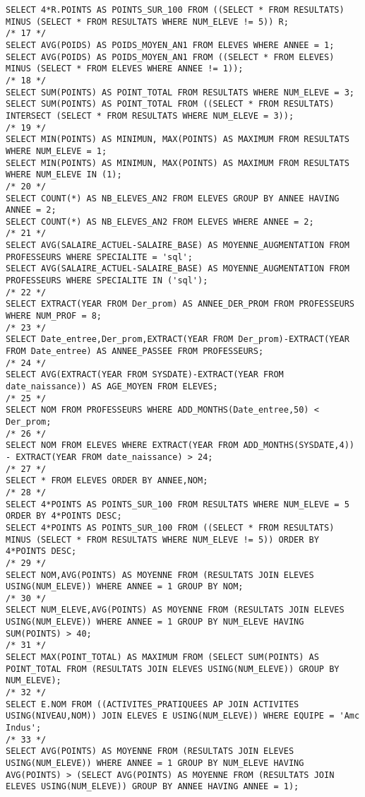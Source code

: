 \documentclass{report}
\begin{document}
\begin{lstlisting}
SELECT 4*R.POINTS AS POINTS_SUR_100 FROM ((SELECT * FROM RESULTATS) MINUS (SELECT * FROM RESULTATS WHERE NUM_ELEVE != 5)) R;
/* 17 */
SELECT AVG(POIDS) AS POIDS_MOYEN_AN1 FROM ELEVES WHERE ANNEE = 1;
SELECT AVG(POIDS) AS POIDS_MOYEN_AN1 FROM ((SELECT * FROM ELEVES) MINUS (SELECT * FROM ELEVES WHERE ANNEE != 1));
/* 18 */
SELECT SUM(POINTS) AS POINT_TOTAL FROM RESULTATS WHERE NUM_ELEVE = 3;
SELECT SUM(POINTS) AS POINT_TOTAL FROM ((SELECT * FROM RESULTATS) INTERSECT (SELECT * FROM RESULTATS WHERE NUM_ELEVE = 3));
/* 19 */
SELECT MIN(POINTS) AS MINIMUN, MAX(POINTS) AS MAXIMUM FROM RESULTATS WHERE NUM_ELEVE = 1;
SELECT MIN(POINTS) AS MINIMUN, MAX(POINTS) AS MAXIMUM FROM RESULTATS WHERE NUM_ELEVE IN (1);
/* 20 */
SELECT COUNT(*) AS NB_ELEVES_AN2 FROM ELEVES GROUP BY ANNEE HAVING ANNEE = 2;
SELECT COUNT(*) AS NB_ELEVES_AN2 FROM ELEVES WHERE ANNEE = 2;
/* 21 */
SELECT AVG(SALAIRE_ACTUEL-SALAIRE_BASE) AS MOYENNE_AUGMENTATION FROM PROFESSEURS WHERE SPECIALITE = 'sql';
SELECT AVG(SALAIRE_ACTUEL-SALAIRE_BASE) AS MOYENNE_AUGMENTATION FROM PROFESSEURS WHERE SPECIALITE IN ('sql');
/* 22 */
SELECT EXTRACT(YEAR FROM Der_prom) AS ANNEE_DER_PROM FROM PROFESSEURS WHERE NUM_PROF = 8;
/* 23 */
SELECT Date_entree,Der_prom,EXTRACT(YEAR FROM Der_prom)-EXTRACT(YEAR FROM Date_entree) AS ANNEE_PASSEE FROM PROFESSEURS;
/* 24 */
SELECT AVG(EXTRACT(YEAR FROM SYSDATE)-EXTRACT(YEAR FROM date_naissance)) AS AGE_MOYEN FROM ELEVES;
/* 25 */
SELECT NOM FROM PROFESSEURS WHERE ADD_MONTHS(Date_entree,50) < Der_prom;
/* 26 */
SELECT NOM FROM ELEVES WHERE EXTRACT(YEAR FROM ADD_MONTHS(SYSDATE,4)) - EXTRACT(YEAR FROM date_naissance) > 24;
/* 27 */
SELECT * FROM ELEVES ORDER BY ANNEE,NOM;
/* 28 */
SELECT 4*POINTS AS POINTS_SUR_100 FROM RESULTATS WHERE NUM_ELEVE = 5 ORDER BY 4*POINTS DESC;
SELECT 4*POINTS AS POINTS_SUR_100 FROM ((SELECT * FROM RESULTATS) MINUS (SELECT * FROM RESULTATS WHERE NUM_ELEVE != 5)) ORDER BY 4*POINTS DESC;
/* 29 */
SELECT NOM,AVG(POINTS) AS MOYENNE FROM (RESULTATS JOIN ELEVES USING(NUM_ELEVE)) WHERE ANNEE = 1 GROUP BY NOM;
/* 30 */
SELECT NUM_ELEVE,AVG(POINTS) AS MOYENNE FROM (RESULTATS JOIN ELEVES USING(NUM_ELEVE)) WHERE ANNEE = 1 GROUP BY NUM_ELEVE HAVING SUM(POINTS) > 40;
/* 31 */
SELECT MAX(POINT_TOTAL) AS MAXIMUM FROM (SELECT SUM(POINTS) AS POINT_TOTAL FROM (RESULTATS JOIN ELEVES USING(NUM_ELEVE)) GROUP BY NUM_ELEVE);
/* 32 */
SELECT E.NOM FROM ((ACTIVITES_PRATIQUEES AP JOIN ACTIVITES USING(NIVEAU,NOM)) JOIN ELEVES E USING(NUM_ELEVE)) WHERE EQUIPE = 'Amc Indus';
/* 33 */
SELECT AVG(POINTS) AS MOYENNE FROM (RESULTATS JOIN ELEVES USING(NUM_ELEVE)) WHERE ANNEE = 1 GROUP BY NUM_ELEVE HAVING AVG(POINTS) > (SELECT AVG(POINTS) AS MOYENNE FROM (RESULTATS JOIN ELEVES USING(NUM_ELEVE)) GROUP BY ANNEE HAVING ANNEE = 1);

\end{lstlisting}
\end{document}
